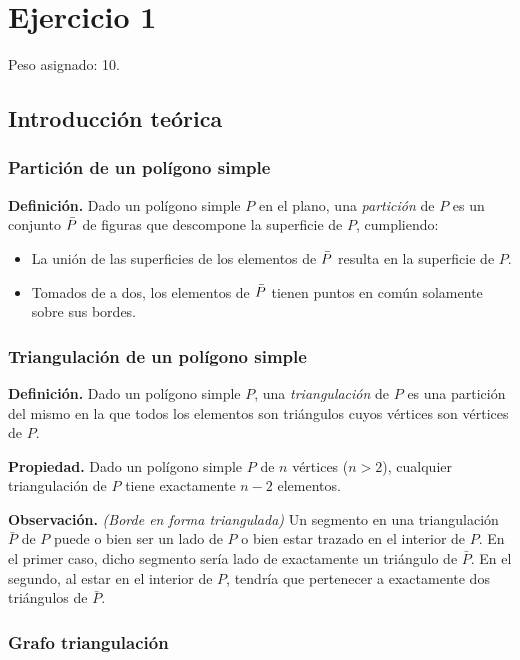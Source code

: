 \section{Ejercicio 1}

Peso asignado: 10.

\subsection{Introducción teórica}

\subsubsection{Partición de un polígono simple}

\textbf{Definición.} Dado un polígono simple $P$ en el plano, una \textit{partición} de $P$ es un conjunto $\bar{P}$ de figuras que descompone la superficie de $P$, cumpliendo:
\begin{itemize}
\setlength\itemsep{0em}
\item La unión de las superficies de los elementos de $\bar{P}$ resulta en la superficie de $P$.
\item Tomados de a dos, los elementos de $\bar{P}$ tienen puntos en común solamente sobre sus bordes.
\end{itemize}

\subsubsection{Triangulación de un polígono simple}

\textbf{Definición.} Dado un polígono simple $P$, una \textit{triangulación} de $P$ es una partición del mismo en la que todos los elementos son triángulos cuyos vértices son vértices de $P$. 

\medskip

\textbf{Propiedad.} Dado un polígono simple $P$ de $n$ vértices ($n > 2$), cualquier triangulación de $P$ tiene exactamente $n-2$ elementos.

\medskip

\textbf{Observación.} \textit{(Borde en forma triangulada)} Un segmento en una triangulación $\bar{P}$ de $P$ puede o bien ser un lado de $P$ o bien estar trazado en el interior de $P$. En el primer caso, dicho segmento sería lado de exactamente un triángulo de $\bar{P}$. En el segundo, al estar en el interior de $P$, tendría que pertenecer a exactamente dos triángulos de $\bar{P}$.

\subsubsection{Grafo triangulación}

